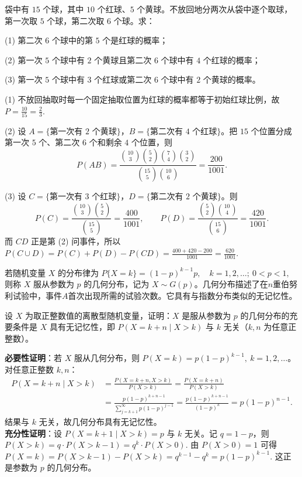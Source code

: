 \documentclass[lang=cn,11pt]{elegantbook}
\begin{document}
\begin{exercise}\label{exer:src-2011-ab-a-02}
袋中有 \(15\) 个球，其中 \(10\) 个红球、\(5\) 个黄球。不放回地分两次从袋中逐个取球，第一次取 \(5\) 个球，第二次取 \(6\) 个球。求：\par
(1) 第二次 \(6\) 个球中的第 \(5\) 个是红球的概率；\par
(2) 第一次 \(5\) 个球中有 \(2\) 个黄球且第二次 \(6\) 个球中有 \(4\) 个红球的概率；\par
(3) 第一次 \(5\) 个球中有 \(3\) 个红球或第二次 \(6\) 个球中有 \(2\) 个黄球的概率。
\end{exercise}
\begin{solution}
(1) 不放回抽取时每一个固定抽取位置为红球的概率都等于初始红球比例，故
\(
P=\frac{10}{15}=\frac23.
\)

(2) 设 \(A=\{\text{第一次有 }2\text{ 个黄球}\}\)，\(B=\{\text{第二次有 }4\text{ 个红球}\}\)。把 \(15\) 个位置分成第一次 \(5\) 个、第二次 \(6\) 个和剩余 \(4\) 个位置，则
\[
P(AB)
=\frac{\binom{10}{3}\binom52\binom74\binom32}
{\binom{15}{5}\binom{10}{6}}
=\frac{200}{1001}.
\]

(3) 设 \(C=\{\text{第一次有 }3\text{ 个红球}\}\)，\(D=\{\text{第二次有 }2\text{ 个黄球}\}\)。则
\[
P(C)=\frac{\binom{10}{3}\binom52}{\binom{15}{5}}=\frac{400}{1001},
\qquad
P(D)=\frac{\binom52\binom{10}{4}}{\binom{15}{6}}=\frac{420}{1001}.
\]
而 \(CD\) 正是第 (2) 问事件，所以
\(
P(C\cup D)=P(C)+P(D)-P(CD)
=\frac{400+420-200}{1001}
=\frac{620}{1001}.
\)
\end{solution}


\begin{definition}[几何分布] \label{def:geometric-dist}
若随机变量 $X$ 的分布律为
\(
P\{X = k\} = (1-p)^{k-1} p,\quad k=1,2,\dots;\ 0 < p < 1,
\)
则称 $X$ 服从参数为 $p$ 的几何分布，记为 $X \sim G(p)$。几何分布描述了在$n$重伯努利试验中，事件$A$首次出现所需的试验次数。它具有与指数分布类似的无记忆性。
\end{definition}


\begin{exercise}[几何分布的无记忆性] \label{exer:2-58}
设 $X$ 为取正整数值的离散型随机变量，证明：$X$ 是服从参数为 $p$ 的几何分布的充要条件是 $X$ 具有无记忆性，即 $P(X=k+n\mid X>k)$ 与 $k$ 无关（$k,n$ 为任意正整数）。
\end{exercise}

\begin{solution}
\textbf{必要性证明}：若 $X$ 服从几何分布，则 $P(X=k)=p(1-p)^{k-1},\ k=1,2,\dots$。对任意正整数 $k,n$：
\[
\begin{aligned}
P(X=k+n\mid X>k) &= \frac{P(X=k+n, X>k)}{P(X>k)} = \frac{P(X=k+n)}{P(X>k)} \\
&= \frac{p(1-p)^{k+n-1}}{\sum_{j=k+1}^{\infty}p(1-p)^{j-1}} = \frac{p(1-p)^{k+n-1}}{(1-p)^k} = p(1-p)^{n-1}.
\end{aligned}
\]
结果与 $k$ 无关，故几何分布具有无记忆性。\\
\textbf{充分性证明}：设 $P(X=k+1\mid X>k)=p$ 与 $k$ 无关。记 $q=1-p$，则
\(
P(X>k) = q\cdot P(X>k-1) = q^k\cdot P(X>0).
\)
由 $P(X>0)=1$ 可得
\(
P(X=k) = P(X>k-1) - P(X>k) = q^{k-1} - q^k = p(1-p)^{k-1}.
\)
这正是参数为 $p$ 的几何分布。
\end{solution}
\end{document}
